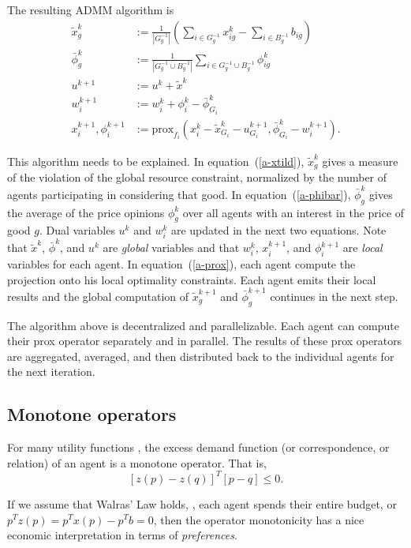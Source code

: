 \documentclass[12pt]{article}
\begin{document}
The resulting ADMM algorithm is 
\begin{align}
\label{a-xtild}
\tilde{x}^k_g &:= \frac{1}{|G^{-1}_g|} \left( \sum_{i \in G^{-1}_g} x^k_{ig} - \sum_{i \in B^{-1}_g} b_{ig}\right)\\
\label{a-phibar}
\bar{\phi}^k_g &:= \frac{1}{ |G^{-1}_g \cup B^{-1}_g| } \sum_{i \in G^{-1}_g \cup B^{-1}_g}\phi^k_{ig}\\
u^{k+1} &:= u^k + \tilde{x}^k\\
w_i^{k+1} &:= w_i^k + \phi^k_i - \bar{\phi}^k_{G_i}\\
\label{a-prox}
x_i^{k+1}, \phi_i^{k+1} &:= \mbox{prox}_{f_i}(x_i^k - \tilde{x}^k_{G_i} - u^{k+1}_{G_i},
\bar{\phi}^k_{G_i} - w_i^{k+1}).
\end{align}

This algorithm needs to be explained.
In equation~(\ref{a-xtild}), $\tilde{x}^k_g$ gives a measure of the violation of
the global resource constraint, normalized by the number of agents participating
in considering that good.
In equation~(\ref{a-phibar}), $\bar{\phi}^k_g$ gives the average of the price
opinions $\phi^k_g$ over all agents with an interest in the price of good $g$.
Dual variables $u^k$ and $w^k_i$ are updated in the next two equations.
Note that $\tilde{x}^k$, $\bar{\phi}^k$, and $u^k$ are \emph{global} variables
and that $w_i^k$, $x_i^{k+1}$, and $\phi_i^{k+1}$ are \emph{local} variables
for each agent. In equation~(\ref{a-prox}), each agent compute the projection
onto his local optimality constraints. Each agent emits their local results and the
global computation of $\tilde{x}^{k+1}_g$ and $\bar{\phi}^{k+1}_g$ continues in the next
step.

The algorithm above is decentralized and parallelizable.
Each agent can compute their prox operator separately and in parallel.
The results of these prox operators are aggregated, averaged, and then distributed
back to the individual agents for the next iteration.

\subsection{Monotone operators}
For many utility functions , the excess demand function
(or correspondence,
or relation) of an agent is a
monotone operator.
That is,
\begin{equation}
\label{e-monotone}
\left[z(p) - z(q) \right]^T \left[p - q\right] \leq 0.
\end{equation}

If we assume that Walras' Law holds, \ie, each agent spends their entire
budget, or $p^T z(p) = p^T x(p) - p^T b = 0$, then the operator monotonicity has
a nice economic interpretation in terms of \emph{preferences}.
\end{document}
